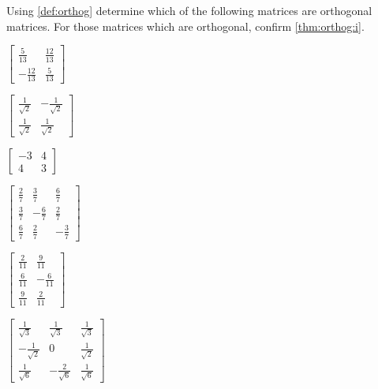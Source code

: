 \begin{exercise}  
Using \cref{def:orthog} determine which of the following matrices are orthogonal matrices.
For those matrices which are orthogonal, confirm \cref{thm:orthog:i}.
\begin{Parts}
\item \(\begin{bmatrix} \frac5{13}&\frac{12}{13}
\\-\frac{12}{13}&\frac5{13} \end{bmatrix}\)

\begin{reduce}
\item \(\begin{bmatrix} \frac1{\sqrt2}&-\frac1{\sqrt2}
\\\frac1{\sqrt2}&\frac1{\sqrt2} \end{bmatrix}\)
\end{reduce}

\item \(\begin{bmatrix} -3&4
\\4&3 \end{bmatrix}\)

\item \(\begin{bmatrix} \frac27&\frac37&\frac67
\\\frac37&-\frac67&\frac27
\\\frac67&\frac27&-\frac37 \end{bmatrix}\)

\item \(\begin{bmatrix} \frac2{11}&\frac9{11}
\\\frac6{11}&-\frac6{11}
\\\frac9{11}&\frac2{11} \end{bmatrix}\)

\begin{reduce}
\item \(\begin{bmatrix} \frac1{\sqrt3}&\frac1{\sqrt3}&\frac1{\sqrt3}
\\-\frac1{\sqrt2}&0&\frac1{\sqrt2}
\\\frac1{\sqrt6}&-\frac2{\sqrt6}&\frac1{\sqrt6} \end{bmatrix}\)


\end{reduce}
\end{Parts}
\end{exercise}
